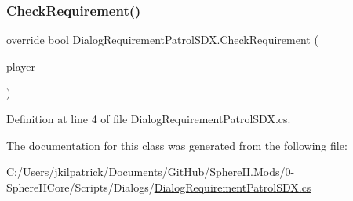 \subsubsection{\texorpdfstring{CheckRequirement()}{CheckRequirement()}}
{\footnotesize\ttfamily override bool Dialog\+Requirement\+Patrol\+S\+D\+X.\+Check\+Requirement (\begin{DoxyParamCaption}\item[{Entity\+Player}]{player }\end{DoxyParamCaption})}



Definition at line 4 of file Dialog\+Requirement\+Patrol\+S\+D\+X.\+cs.



The documentation for this class was generated from the following file\+:\begin{DoxyCompactItemize}
\item 
C\+:/\+Users/jkilpatrick/\+Documents/\+Git\+Hub/\+Sphere\+I\+I.\+Mods/0-\/\+Sphere\+I\+I\+Core/\+Scripts/\+Dialogs/\mbox{\hyperlink{_dialog_requirement_patrol_s_d_x_8cs}{Dialog\+Requirement\+Patrol\+S\+D\+X.\+cs}}\end{DoxyCompactItemize}
